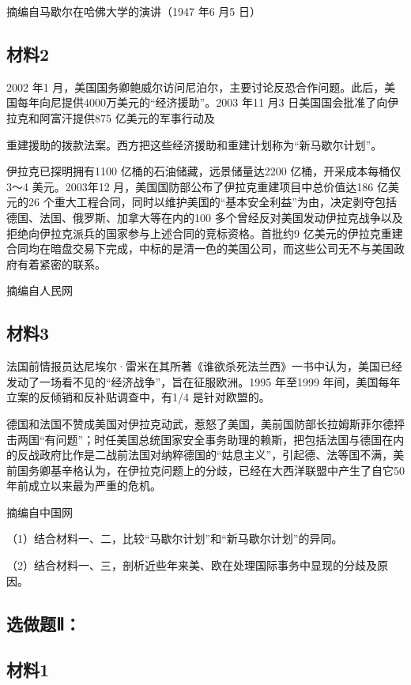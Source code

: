 \documentclass[UTF8,11pt]{ctexart}
\begin{document}
摘编自马歇尔在哈佛大学的演讲（1947 年6 月5 日）

\subsection*{材料2}

2002 年1 月，美国国务卿鲍威尔访问尼泊尔，主要讨论反恐合作问题。此后，美国每年向尼提供4000万美元的“经济援助”。2003 年11 月3 日美国国会批准了向伊拉克和阿富汗提供875 亿美元的军事行动及


重建援助的拨款法案。西方把这些经济援助和重建计划称为“新马歇尔计划”。

伊拉克已探明拥有1100 亿桶的石油储藏，远景储量达2200 亿桶，开采成本每桶仅3～4 美元。2003年12 月，美国国防部公布了伊拉克重建项目中总价值达186 亿美元的26 个重大工程合同，同时以维护美国的“基本安全利益”为由，决定剥夺包括德国、法国、俄罗斯、加拿大等在内的100 多个曾经反对美国发动伊拉克战争以及拒绝向伊拉克派兵的国家参与上述合同的竞标资格。首批约9 亿美元的伊拉克重建合同均在暗盘交易下完成，中标的是清一色的美国公司，而这些公司无不与美国政府有着紧密的联系。

摘编自人民网

\subsection*{材料3}

法国前情报员达尼埃尔·雷米在其所著《谁欲杀死法兰西》一书中认为，美国已经发动了一场看不见的“经济战争”，旨在征服欧洲。1995 年至1999 年间，美国每年立案的反倾销和反补贴调查中，有1/4 是针对欧盟的。

德国和法国不赞成美国对伊拉克动武，惹怒了美国，美前国防部长拉姆斯菲尔德抨击两国“有问题”；时任美国总统国家安全事务助理的赖斯，把包括法国与德国在内的反战政府比作是二战前法国对纳粹德国的“姑息主义”，引起德、法等国不满，美前国务卿基辛格认为，在伊拉克问题上的分歧，已经在大西洋联盟中产生了自它50 年前成立以来最为严重的危机。

摘编自中国网

（1）结合材料一、二，比较“马歇尔计划”和“新马歇尔计划”的异同。


（2）结合材料一、三，剖析近些年来美、欧在处理国际事务中显现的分歧及原因。


\subsection*{选做题Ⅱ：}

\subsection*{材料1}
\end{document}
